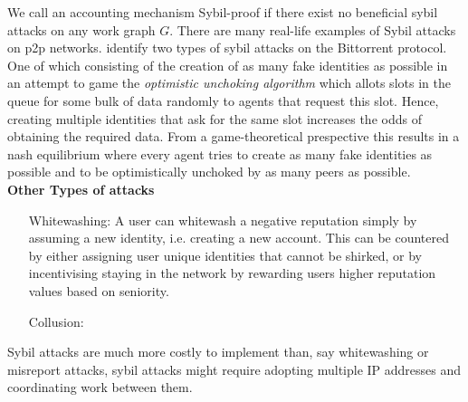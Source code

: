 \documentclass[11pt,a4paper]{article}
\theoremstyle{definition}
\theoremstyle{theorem}
\theoremstyle{proposition}
\theoremstyle{corollary}
\theoremstyle{lemma}
\theoremstyle{example}
\theoremstyle{remark}
\begin{document}
We call an accounting mechanism Sybil-proof if there exist no beneficial sybil attacks on any work graph $G$. There are many real-life examples of Sybil attacks on p2p networks. \cite{Bittorrent is an auction} identify two types of sybil attacks on the Bittorrent protocol. One of which consisting of the creation of as many fake identities as possible in an attempt to game the {\it optimistic unchoking algorithm} which allots slots in the queue for some bulk of data randomly to agents that request this slot. Hence, creating multiple identities that ask for the same slot increases the odds of obtaining the required data. From a game-theoretical prespective this results in a nash equilibrium where every agent tries to create as many fake identities as possible and to be optimistically unchoked by as many peers as possible. \vspace{1em}\\ 

\noindent{} {\bf Other Types of attacks}
\begin{itemize}
\item[Whitewashing:] A user can whitewash a negative reputation simply by assuming a new identity, i.e. creating a new account. This can be countered by either assigning user unique identities that cannot be shirked, or by incentivising staying in the network by rewarding users higher reputation values based on seniority.
\item[Collusion:] 
\end{itemize} 
Sybil attacks are much more costly to implement than, say whitewashing or misreport attacks, sybil attacks might require adopting multiple IP addresses and coordinating work between them.
\end{document}
